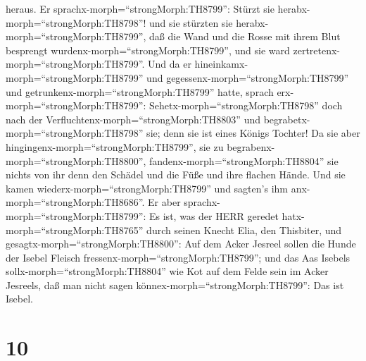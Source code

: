 heraus.  Er sprachx-morph=``strongMorph:TH8799'': Stürzt
sie herabx-morph=``strongMorph:TH8798''! und sie stürzten sie
herabx-morph=``strongMorph:TH8799'', daß die Wand und die Rosse mit
ihrem Blut besprengt wurdenx-morph=``strongMorph:TH8799'', und sie ward
zertretenx-morph=``strongMorph:TH8799''.  Und da er
hineinkamx-morph=``strongMorph:TH8799'' und
gegessenx-morph=``strongMorph:TH8799'' und
getrunkenx-morph=``strongMorph:TH8799'' hatte, sprach
erx-morph=``strongMorph:TH8799'': Sehetx-morph=``strongMorph:TH8798''
doch nach der Verfluchtenx-morph=``strongMorph:TH8803'' und
begrabetx-morph=``strongMorph:TH8798'' sie; denn sie ist eines Königs
Tochter!  Da sie aber
hingingenx-morph=``strongMorph:TH8799'', sie zu
begrabenx-morph=``strongMorph:TH8800'',
fandenx-morph=``strongMorph:TH8804'' sie nichts von ihr denn den Schädel
und die Füße und ihre flachen Hände.  Und sie kamen
wiederx-morph=``strongMorph:TH8799'' und sagten's ihm
anx-morph=``strongMorph:TH8686''. Er aber
sprachx-morph=``strongMorph:TH8799'': Es ist, was der HERR geredet
hatx-morph=``strongMorph:TH8765'' durch seinen Knecht Elia, den
Thisbiter, und gesagtx-morph=``strongMorph:TH8800'': Auf dem Acker
Jesreel sollen die Hunde der Isebel Fleisch
fressenx-morph=``strongMorph:TH8799'';  und das Aas Isebels
sollx-morph=``strongMorph:TH8804'' wie Kot auf dem Felde sein im Acker
Jesreels, daß man nicht sagen könnex-morph=``strongMorph:TH8799'': Das
ist Isebel.

\hypertarget{section-9}{%
\section{10}\label{section-9}}

